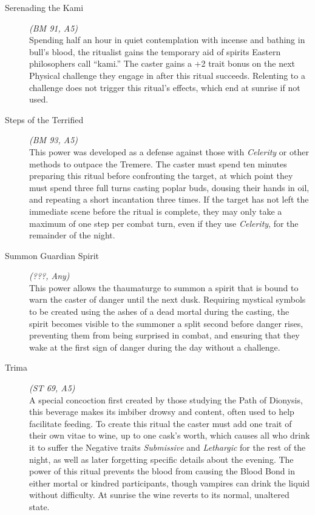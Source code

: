 \begin{description}
	\item[Serenading the Kami] \emph{(BM 91, A5)} \hfill \\
	Spending half an hour in quiet contemplation with incense and bathing in bull's blood, the ritualist gains the temporary aid of 
	spirits Eastern philosophers call ``kami.''  The caster gains a +2 trait bonus on the next Physical challenge they engage in after 
	this ritual succeeds.  Relenting to a challenge does not trigger this ritual's effects, which end at sunrise if not used. \\

	\item[Steps of the Terrified] \emph{(BM 93, A5)} \hfill \\
	This power was developed as a defense against those with \emph{Celerity} or other methods to outpace the Tremere. The caster must 
	spend ten minutes preparing this ritual before confronting the target, at which point they must spend three full turns casting 
	poplar buds, dousing their hands in oil, and repeating a short incantation three times.  If the target has not left the immediate 
	scene before the ritual is complete, they may only take a maximum of one step per combat turn, even if they use \emph{Celerity}, 
	for the remainder of the night. \\

	\item[Summon Guardian Spirit] \emph{(???, Any)} \hfill \\
	This power allows the thaumaturge to summon a spirit that is bound to warn the caster of danger until the next dusk.  Requiring 
	mystical symbols to be created using the ashes of a dead mortal during the casting, the spirit becomes visible to the summoner a 
	split second before danger rises, preventing them from being surprised in combat, and ensuring that they wake at the first sign of 
	danger during the day without a challenge. \\

	\item[Trima] \emph{(ST 69, A5)} \hfill \\
	A special concoction first created by those studying the Path of Dionysis, this beverage makes its imbiber drowsy and content, often 
	used to help facilitate feeding.  To create this ritual the caster must add one trait of their own vitae to wine, up to one cask's 
	worth, which causes all who drink it to suffer the Negative traits \emph{Submissive} and \emph{Lethargic} for the rest of the night, 
	as well as later forgetting specific details about the evening. The power of this ritual prevents the blood from causing the Blood 
	Bond in either mortal or kindred participants, though vampires can drink the liquid without difficulty.  At sunrise the wine 
	reverts to its normal, unaltered state. \\


\end{description}
